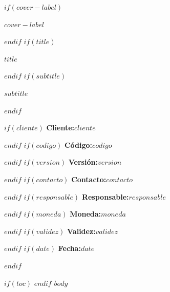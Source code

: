 \documentclass[11pt,letterpaper]{article}
\newif\ifcoverpage
\begin{document}
\color{sombra}
\thispagestyle{empty}
\vspace*{1.62in}
$if(cover-label)$
{\scriptsize\color{oceano}\MakeUppercase{$cover-label$}\par}
$endif$
\vspace{0.14in}
$if(title)$
{\fontsize{30}{35}\selectfont\bfseries $title$\par}
$endif$
\vspace{0.14in}
$if(subtitle)$
{\fontsize{17}{22}\selectfont\color{gris}$subtitle$\par}
$endif$
\vspace{0.72in}
\begin{minipage}{0.74\textwidth}
$if(cliente)$ \textbf{Cliente:}\quad $cliente$\par
$endif$
$if(codigo)$ \textbf{Código:}\quad $codigo$\par
$endif$
$if(version)$ \textbf{Versión:}\quad $version$\par
$endif$
$if(contacto)$ \textbf{Contacto:}\quad $contacto$\par
$endif$
$if(responsable)$ \textbf{Responsable:}\quad $responsable$\par
$endif$
$if(moneda)$ \textbf{Moneda:}\quad $moneda$\par
$endif$
$if(validez)$ \textbf{Validez:}\quad $validez$\par
$endif$
$if(date)$ \textbf{Fecha:}\quad $date$\par
$endif$
\end{minipage}\par
\clearpage
\coverpagefalse
\setcounter{page}{1}
\pagestyle{scrheadings}
$if(toc)$
\tableofcontents
\newpage
$endif$
$body$
\end{document}
